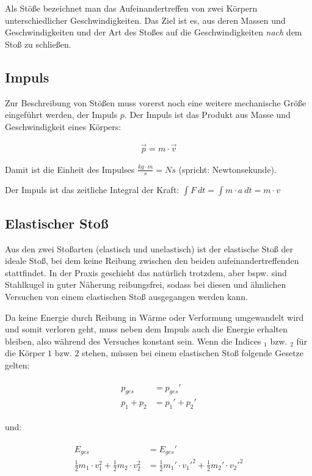 Als Stöße bezeichnet man das Aufeinandertreffen von zwei Körpern unterschiedlicher Geschwindigkeiten. Das Ziel ist es, aus deren Massen und Geschwindigkeiten und der Art des Stoßes auf die Geschwindigkeiten \emph{nach} dem Stoß zu schließen.

\subsection{Impuls}

Zur Beschreibung von Stößen muss vorerst noch eine weitere mechanische Größe eingeführt werden, der Impuls $p$. Der Impuls ist das Produkt aus Masse und Geschwindigkeit eines Körpers:

\begin{align}
	\vec{p} = m \cdot \vec{v}
\end{align}

\noindent Damit ist die Einheit des Impulses $\frac{kg \cdot m}{s} = Ns$ (spricht: \glqq Newtonsekunde\grqq).

\begin{NiceToKnow}
Der Impuls ist das zeitliche Integral der Kraft: $\int F \ dt = \int m \cdot a \ dt = m \cdot v$
\end{NiceToKnow}


\subsection{Elastischer Stoß}

Aus den zwei Stoßarten (elastisch und unelastisch) ist der elastische Stoß der ideale Stoß, bei dem keine Reibung zwischen den beiden aufeinandertreffenden stattfindet. In der Praxis geschieht das natürlich trotzdem, aber bspw. sind Stahlkugel in guter Näherung reibungsfrei, sodass bei diesen und ähnlichen Versuchen von einem elastischen Stoß ausgegangen werden kann.

Da keine Energie durch Reibung in Wärme oder Verformung umgewandelt wird und somit \glqq verloren geht\grqq , muss neben dem Impuls auch die Energie erhalten bleiben, also während des Versuches konstant sein. Wenn die Indices $_1$ bzw. $_2$ für die Körper $1$ bzw. $2$ stehen, müssen bei einem elastischen Stoß folgende Gesetze gelten:

\begin{align}
\begin{split}
	p_{ges} &= p_{ges}' \\
	p_1 + p_2 &= p_1' + p_2'
\end{split}
\end{align}

\noindent und:

\begin{align}
\begin{split}
	E_{ges} &= E_{ges}' \\
	\frac{1}{2} m_1 \cdot v_1^2 + \frac{1}{2} m_2 \cdot v_2^2 &= \frac{1}{2} m_1' \cdot v_1'^2 + \frac{1}{2} m_2' \cdot v_2'^2
\end{split}
\end{align}

